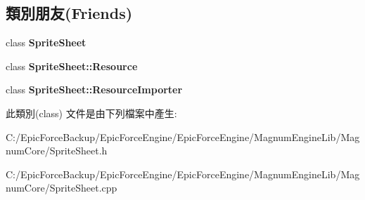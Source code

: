 \subsection*{類別朋友(Friends)}
\begin{DoxyCompactItemize}
\item 
class {\bfseries Sprite\+Sheet}\hypertarget{class_magnum_1_1_sprite_sheet_1_1_data_ab43118917ba092ba6289c7ee4cd3e5fd}{}\label{class_magnum_1_1_sprite_sheet_1_1_data_ab43118917ba092ba6289c7ee4cd3e5fd}

\item 
class {\bfseries Sprite\+Sheet\+::\+Resource}\hypertarget{class_magnum_1_1_sprite_sheet_1_1_data_a8727041c910f9527ea7b20dfac74f485}{}\label{class_magnum_1_1_sprite_sheet_1_1_data_a8727041c910f9527ea7b20dfac74f485}

\item 
class {\bfseries Sprite\+Sheet\+::\+Resource\+Importer}\hypertarget{class_magnum_1_1_sprite_sheet_1_1_data_a3c6baee866d2819736b4c0a94c9e507c}{}\label{class_magnum_1_1_sprite_sheet_1_1_data_a3c6baee866d2819736b4c0a94c9e507c}

\end{DoxyCompactItemize}


此類別(class) 文件是由下列檔案中產生\+:\begin{DoxyCompactItemize}
\item 
C\+:/\+Epic\+Force\+Backup/\+Epic\+Force\+Engine/\+Epic\+Force\+Engine/\+Magnum\+Engine\+Lib/\+Magnum\+Core/Sprite\+Sheet.\+h\item 
C\+:/\+Epic\+Force\+Backup/\+Epic\+Force\+Engine/\+Epic\+Force\+Engine/\+Magnum\+Engine\+Lib/\+Magnum\+Core/Sprite\+Sheet.\+cpp\end{DoxyCompactItemize}

